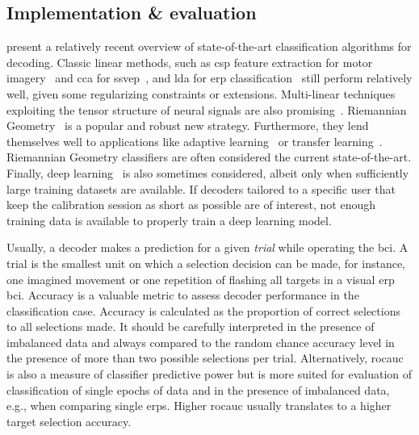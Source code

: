 \subsection{Implementation \& evaluation}

\textcite{Lotte2018, Xu2021} present a relatively recent overview of state-of-the-art
classification algorithms for decoding.
Classic linear methods, such as \ac{csp} feature extraction for motor
imagery~\cite{Park2017} and \ac{cca} for \ac{ssvep}~\cite{Nakanishi2017}, and \ac{lda}
for \ac{erp} classification~\cite{Sosulski2022} still perform relatively well, given
some regularizing constraints or extensions.
Multi-linear techniques exploiting the tensor structure of neural signals are also
promising~\cite{Lotte2018}.
Riemannian Geometry~\cite{Barachant2014} is a popular and robust new strategy.
Furthermore, they lend themselves well to applications like adaptive
learning~\cite{Benaroch2021} or transfer learning~\cite{Zanini2017}.
Riemannian Geometry classifiers are often considered the current state-of-the-art.
Finally, deep learning~\cite{Bhuvaneshwari2021} is also sometimes considered, albeit
only when sufficiently large training datasets are available.
If decoders tailored to a specific user that keep the calibration session as short as
possible are of interest, not enough training data is available to properly train a deep
learning model.

Usually, a decoder makes a prediction for a given \emph{trial} while operating the
\ac{bci}.
A trial is the smallest unit on which a selection decision can be made, for instance,
one imagined movement or one repetition of flashing all targets in a visual \ac{erp}
\ac{bci}.
Accuracy is a valuable metric to assess decoder performance in the classification case.
Accuracy is calculated as the proportion of correct selections to all selections made.
It should be carefully interpreted in the presence of imbalanced data and always
compared to the random chance accuracy level in the presence of more than two possible
selections per trial.
Alternatively, \ac{rocauc} is also a measure of classifier predictive power but is more
suited for evaluation of classification of single epochs of data and in the presence of
imbalanced data, e.g., when comparing single \acp{erp}.
Higher \ac{rocauc} usually translates to a higher target selection accuracy.

